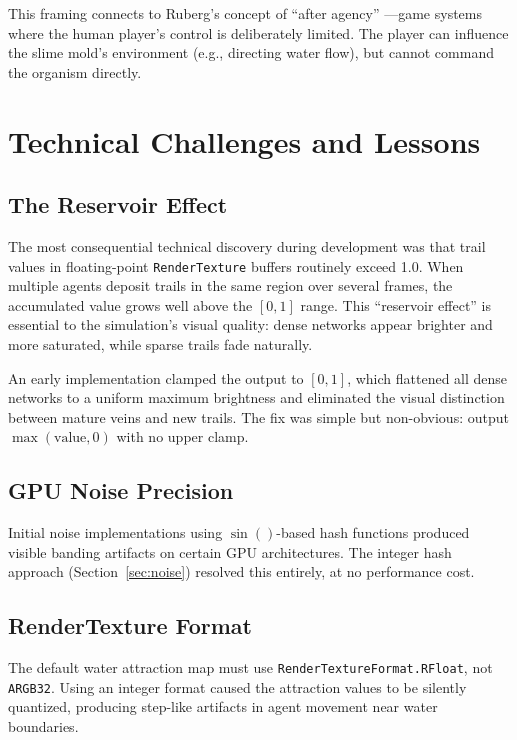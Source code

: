 \documentclass[12pt, titlepage]{article}
\begin{document}
This framing connects to Ruberg's concept of ``after agency''
\cite{ruberg2022}---game systems where the human player's control is
deliberately limited. The player can influence the slime mold's environment
(e.g., directing water flow), but cannot command the organism directly.

\section{Technical Challenges and Lessons}
\label{sec:challenges}

\subsection{The Reservoir Effect}

The most consequential technical discovery during development was that trail
values in floating-point \texttt{RenderTexture} buffers routinely exceed 1.0.
When multiple agents deposit trails in the same region over several frames, the
accumulated value grows well above the $[0, 1]$ range. This ``reservoir
effect'' is essential to the simulation's visual quality: dense networks appear
brighter and more saturated, while sparse trails fade naturally.

An early implementation clamped the output to $[0, 1]$, which flattened all
dense networks to a uniform maximum brightness and eliminated the visual
distinction between mature veins and new trails. The fix was simple but
non-obvious: output $\max(\text{value}, 0)$ with no upper clamp.

\subsection{GPU Noise Precision}

Initial noise implementations using $\sin()$-based hash functions produced
visible banding artifacts on certain GPU architectures. The integer hash
approach (Section~\ref{sec:noise}) resolved this entirely, at no performance
cost.

\subsection{RenderTexture Format}

The default water attraction map must use
\texttt{RenderTextureFormat.RFloat}, not \texttt{ARGB32}. Using an integer
format caused the attraction values to be silently quantized, producing
step-like artifacts in agent movement near water boundaries.
\end{document}
